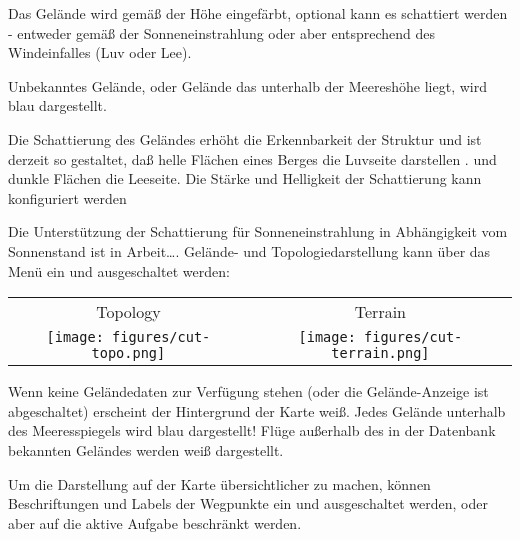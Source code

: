 Das Gelände wird gemäß der Höhe eingefärbt, optional kann es schattiert werden -  entweder gemäß der Sonneneinstrahlung oder aber entsprechend des Windeinfalles (Luv oder Lee).

Unbekanntes Gelände, oder Gelände das unterhalb der Meereshöhe liegt, wird blau dargestellt.

Die Schattierung des Geländes erhöht die Erkennbarkeit der Struktur und ist derzeit so gestaltet, daß helle Flächen eines Berges die Luvseite darstellen . und dunkle Flächen die Leeseite.
Die Stärke und Helligkeit der Schattierung kann konfiguriert werden 

Die Unterstützung der Schattierung für Sonneneinstrahlung in Abhängigkeit vom Sonnenstand ist in Arbeit\dots.
Gelände- und Topologiedarstellung kann über das Menü ein und ausgeschaltet werden:

\begin{center}
\begin{tabular}{c c}
Topology & Terrain \\
\texttt{[image: figures/cut-topo.png]} &
\texttt{[image: figures/cut-terrain.png]} \\
\end{tabular}
\end{center}

Wenn keine Geländedaten zur Verfügung stehen (oder die Gelände-Anzeige ist abgeschaltet) erscheint der Hintergrund der Karte weiß. Jedes Gelände unterhalb des Meeresspiegels wird blau dargestellt!
Flüge außerhalb des in der Datenbank bekannten Geländes werden weiß dargestellt.

Um die Darstellung auf der Karte übersichtlicher zu machen, können Beschriftungen und Labels der Wegpunkte ein und ausgeschaltet werden, oder aber auf die aktive Aufgabe beschränkt werden.



